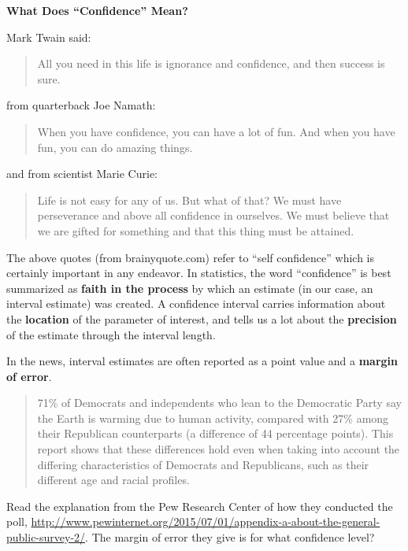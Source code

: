 \def\theTopic{Reading 6}



\begin{center}
\vspace*{-.2in}
{\bf {\large What Does ``Confidence'' Mean?}}\\
\end{center}

Mark Twain said:
\begin{quotation}
All you need in this life is ignorance and confidence, and then
success is sure.   
\end{quotation}

 from quarterback Joe Namath:
\begin{quotation}
When you have confidence, you can have a lot of fun. And when you have fun, you can do amazing things.  
\end{quotation}

and from scientist Marie Curie:
\begin{quotation}
  Life is not easy for any of us. But what of that? We must have
  perseverance and above all confidence in ourselves. We must believe
  that we are gifted for something and that this thing must be
  attained. 
\end{quotation}

The above quotes (from brainyquote.com) refer to  ``self confidence''
which is certainly important in any endeavor.
In statistics, the word ``confidence'' is best summarized as {\bf
  faith in the process} by which an estimate (in our case, an interval
estimate) was created.  A confidence interval carries information
about the {\bf location} of the parameter of interest, and tells us a lot
about the {\bf precision} of the estimate through the interval
length. 


In the news, interval estimates are often reported as a point value
and a {\bf margin of error}. 

\begin{quotation}
  71\% of Democrats and independents who lean to the Democratic Party
  say the Earth is warming due to human activity, compared with 27\%
  among their Republican counterparts (a difference of 44 percentage
  points). This report shows that these differences hold even when
  taking into account the differing characteristics of Democrats and
  Republicans, such as their different age and racial profiles. 
\end{quotation}

  Read the explanation from the  Pew Research Center  of how they
  conducted the poll,
\url{http://www.pewinternet.org/2015/07/01/appendix-a-about-the-general-public-survey-2/}.
 The margin of error they give is for what confidence level?
  \vfill

